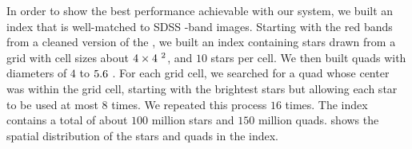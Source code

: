 

In order to show the best performance achievable with our system, we
built an index that is well-matched to SDSS \rband-band images.
Starting with the red bands from a cleaned version of the \USNOB, we
built an index containing stars drawn from a \healpix grid with cell
sizes about $4\times4~^2$, and $10$ stars per cell.  We then
built quads with diameters of $4$ to $5.6~$.  For each grid
cell, we searched for a quad whose center was within the grid cell,
starting with the brightest stars but allowing each star to be used at
most $8$ times.  We repeated this process $16$ times.  The index
contains a total of about $100$ million stars and $150$ million quads.
 shows the spatial distribution of the stars and
quads in the index.


